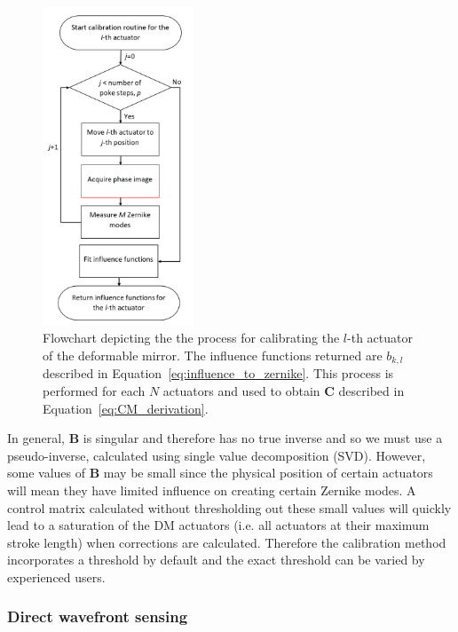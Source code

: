\begin{figure}[h]
	\centering
	\includegraphics[width=0.4\textwidth, scale=0.5]{./images/Ith_actuator_calibration_workflow.jpg}
	\caption{Flowchart depicting the the process for calibrating the $l$-th actuator of the deformable mirror. The influence functions returned are $b_{k,l}$ described in Equation~\ref{eq:influence_to_zernike}. This process is performed for each $N$ actuators and used to obtain $\boldsymbol{C}$ described in Equation~\ref{eq:CM_derivation}.}
	\label{fig:Ith_actuator_calibration_workflow}
\end{figure}

In general, $\boldsymbol{B}$ is singular and therefore has no true inverse and so we must use a pseudo-inverse, calculated using single value decomposition (SVD). However, some values of $\boldsymbol{B}$ may be small since the physical position of certain actuators will mean they have limited influence on creating certain Zernike modes. A control matrix calculated without thresholding out these small values will quickly lead to a saturation of the DM actuators (i.e. all actuators at their maximum stroke length) when corrections are calculated.\cite{booth2005methods} Therefore the calibration method incorporates a threshold by default and the exact threshold can be varied by experienced users.

\subsubsection{Direct wavefront sensing}

